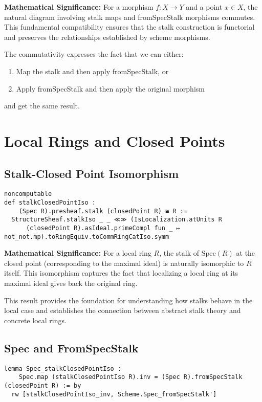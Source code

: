 \documentclass{article}
\theoremstyle{definition}
\begin{document}
\textbf{Mathematical Significance:} For a morphism $f: X \to Y$ and a point $x \in X$, the natural diagram involving stalk maps and fromSpecStalk morphisms commutes. This fundamental compatibility ensures that the stalk construction is functorial and preserves the relationships established by scheme morphisms.

The commutativity expresses the fact that we can either:
\begin{enumerate}
\item Map the stalk and then apply fromSpecStalk, or
\item Apply fromSpecStalk and then apply the original morphism
\end{enumerate}
and get the same result.

\section{Local Rings and Closed Points}

\subsection{Stalk-Closed Point Isomorphism}

\begin{lstlisting}
noncomputable
def stalkClosedPointIso :
    (Spec R).presheaf.stalk (closedPoint R) ≅ R :=
  StructureSheaf.stalkIso _ _ ≪≫ (IsLocalization.atUnits R
      (closedPoint R).asIdeal.primeCompl fun _ ↦ not_not.mp).toRingEquiv.toCommRingCatIso.symm
\end{lstlisting}

\textbf{Mathematical Significance:} For a local ring $R$, the stalk of $\mathrm{Spec}(R)$ at the closed point (corresponding to the maximal ideal) is naturally isomorphic to $R$ itself. This isomorphism captures the fact that localizing a local ring at its maximal ideal gives back the original ring.

This result provides the foundation for understanding how stalks behave in the local case and establishes the connection between abstract stalk theory and concrete local rings.

\subsection{Spec and FromSpecStalk}

\begin{lstlisting}
lemma Spec_stalkClosedPointIso :
    Spec.map (stalkClosedPointIso R).inv = (Spec R).fromSpecStalk (closedPoint R) := by
  rw [stalkClosedPointIso_inv, Scheme.Spec_fromSpecStalk']
\end{lstlisting}
\end{document}
